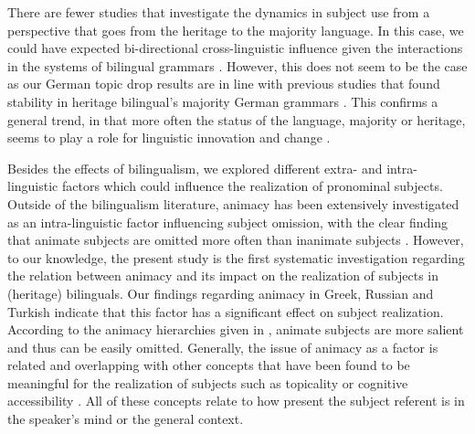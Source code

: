 \documentclass[output=paper,colorlinks,citecolor=brown]{langscibook}
\begin{document}
There are fewer studies that investigate the dynamics in subject use from a perspective that goes from the heritage to the majority language. In this case, we could have expected bi-directional cross-linguistic influence given the interactions in the systems of bilingual grammars \parencite{zhou2021bidirectional}. However, this does not seem to be the case as our German topic drop results are in line with previous studies that found stability in heritage bilingual's majority German grammars \parencite{schmitz2012null, flores2020factors, brehmer2023same}. This confirms a general trend, in that more often the status of the language, majority or heritage, seems to play a role for linguistic innovation and change \parencite{wiese2022heritage}.

Besides the effects of bilingualism, we explored different extra- and intra\hyp linguistic factors which could influence the realization of pronominal subjects. Outside of the bilingualism literature, animacy has been extensively investigated as an intra\hyp linguistic factor influencing subject omission, with the clear finding that animate subjects are
omitted more often than inanimate subjects \parencite{pu1997zero, meyerhoff2009replication, li2012variation, vollmer2019radical}. However, to our knowledge, the present study is the first systematic investigation regarding the relation between animacy and its impact on the realization of subjects in (heritage) bilinguals. Our findings regarding animacy in Greek, Russian and Turkish indicate that this factor has a significant effect on subject realization. According to the animacy hierarchies  given in \textcite{corbett2000number}, animate subjects are more salient and thus can be easily omitted. Generally, the issue of animacy as a factor is related and overlapping with other concepts that have been found to be meaningful for the realization of subjects such as topicality or cognitive accessibility \parencite{lee2007contrastive, allen2015role, laleko2017silence}. All of these concepts relate to how present the subject referent is in the speaker's mind or the general context.
\end{document}
